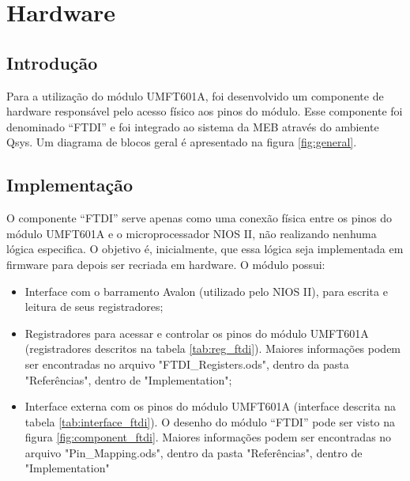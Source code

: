 \chapter{Hardware}

  \section{Introdução}
    Para a utilização do módulo UMFT601A, foi desenvolvido um componente de hardware responsável pelo acesso físico aos pinos do módulo. Esse componente foi denominado “FTDI” e foi integrado ao sistema da MEB através do ambiente Qsys. Um diagrama de blocos geral é apresentado na figura \ref{fig:general}.
    
  \section{Implementação}
    O componente “FTDI” serve apenas como uma conexão física entre os pinos do módulo UMFT601A e o microprocessador NIOS II, não realizando nenhuma lógica especifica. O objetivo é, inicialmente, que essa lógica seja implementada em firmware para depois ser recriada em hardware.
    O módulo possui:
    \begin{itemize}
    	\item Interface com o barramento Avalon (utilizado pelo NIOS II), para escrita e leitura de seus registradores;
    	\item Registradores para acessar e controlar os pinos do módulo UMFT601A (registradores descritos na tabela \ref{tab:reg_ftdi}). Maiores informações podem ser encontradas no arquivo "FTDI\_Registers.ods", dentro da pasta "Referências", dentro de "Implementation";
    	\item Interface externa com os pinos do módulo UMFT601A (interface descrita na tabela \ref{tab:interface_ftdi}).
    	O desenho do módulo “FTDI” pode ser visto na figura \ref{fig:component_ftdi}. Maiores informações podem ser encontradas no arquivo "Pin\_Mapping.ods", dentro da pasta "Referências", dentro de "Implementation"
    \end{itemize}
    \bigskip
   
